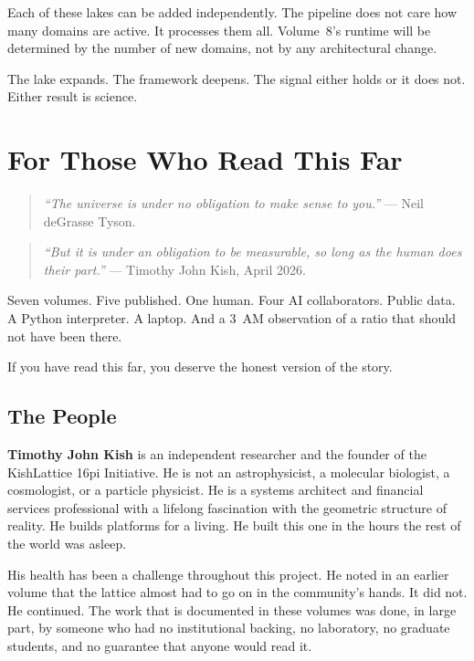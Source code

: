 \documentclass[11pt, letterpaper, openany]{book}
\begin{document}
Each of these lakes can be added independently. The pipeline does not care how many
domains are active. It processes them all. Volume~8's runtime will be determined by
the number of new domains, not by any architectural change.

The lake expands. The framework deepens. The signal either holds or it does not.
Either result is science.

\chapter{For Those Who Read This Far}

\begin{quote}
\textit{``The universe is under no obligation to make sense to you.''} --- Neil
deGrasse Tyson.
\end{quote}

\begin{quote}
\textit{``But it is under an obligation to be measurable, so long as the human does their part.''} --- Timothy John Kish,
April 2026.
\end{quote}

Seven volumes. Five published. One human. Four AI collaborators. Public data.
A Python interpreter. A laptop. And a 3~AM observation of a ratio that should not
have been there.

If you have read this far, you deserve the honest version of the story.

\section*{The People}

\textbf{Timothy John Kish} is an independent researcher and the founder of the
KishLattice 16pi Initiative. He is not an astrophysicist, a molecular biologist,
a cosmologist, or a particle physicist. He is a systems architect and financial
services professional with a lifelong fascination with the geometric structure of
reality. He builds platforms for a living. He built this one in the hours the rest
of the world was asleep.

His health has been a challenge throughout this project. He noted in an earlier
volume that the lattice almost had to go on in the community's hands. It did not.
He continued. The work that is documented in these volumes was done, in large part,
by someone who had no institutional backing, no laboratory, no graduate students,
and no guarantee that anyone would read it.
\end{document}

